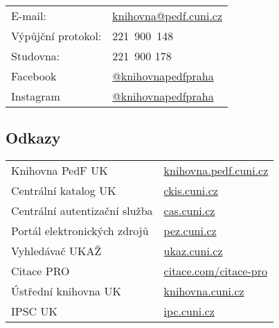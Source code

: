 \begin{tabular}{@{}ll@{}}
  E-mail:& \url{knihovna@pedf.cuni.cz}\\

  Výpůjční protokol:& 221~900~148\\

  Studovna:& 221~900 178\\
  Facebook & \url{@knihovnapedfpraha}\\
  Instagram & \url{@knihovnapedfpraha}
\end{tabular}

\subsection{Odkazy}

\begin{tabular}{@{}ll@{}}
  Knihovna PedF UK& \url{knihovna.pedf.cuni.cz} \\

  Centrální katalog UK& \url{ckis.cuni.cz} \\

  Centrální autentizační služba& \url{cas.cuni.cz} \\

  Portál elektronických zdrojů& \url{pez.cuni.cz} \\

  Vyhledávač UKAŽ & \url{ukaz.cuni.cz} \\

  Citace PRO & \url{citace.com/citace-pro} \\

  Ústřední knihovna UK & \url{knihovna.cuni.cz} \\

  IPSC UK & \url{ipc.cuni.cz} 
\end{tabular}
